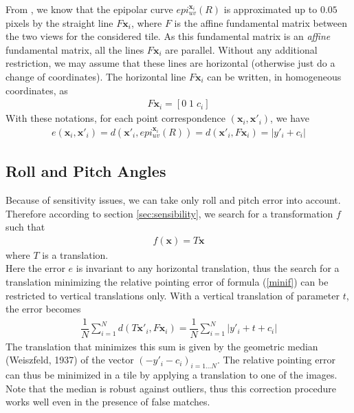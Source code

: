 \documentclass[paper=a4, fontsize=11pt]{article}
\begin{document}
From  \cite{de2014automatic}, we know that the epipolar curve $epi^{\textbf{x}_i}_{u v}(R)$ is approximated up to $0.05$ pixels by the straight line $F\textbf{x}_i$, where $F$ is
the affine fundamental matrix between the two views for the considered tile. As this fundamental matrix is an \textit{affine} fundamental matrix, all the lines $F\textbf{x}_i$ are parallel. Without any additional restriction, we may assume that these lines are horizontal (otherwise just do a change of coordinates). The horizontal line $F\textbf{x}_i$ can be written, in homogeneous coordinates, as
\begin{align*}
F\textbf{x}_i = \left[ 0 \; 1 \; c_i \right]
\end{align*}
With these notations, for each point correspondence $(\textbf{x}_i , \textbf{x}'_i)$, we have
\begin{align*}
e(\textbf{x}_i, \textbf{x}'_i) = d(\textbf{x}'_i, epi^{\textbf{x}_i}_{u v}(R)) = d(\textbf{x}'_i, F\textbf{x}_i) = | y'_i + c_i|
\end{align*}

\subsection{Roll and Pitch Angles}
Because of sensitivity issues, we can take only roll and pitch error into account. Therefore according to section \ref{sec:sensibility}, we search for a transformation $f$ such that
\begin{align*}
f(\textbf{x}) = T\textbf{x}
\end{align*}
where $T$ is a translation.\\
Here the error $e$ is invariant to any horizontal translation, thus the search for a translation minimizing the relative pointing error of formula (\ref{minif}) can be restricted to vertical translations only. With a vertical translation of parameter $t$, the error becomes
\begin{align*}
\dfrac{1}{N} \sum\limits_{i=1}^{N} d(T\textbf{x}'_i, F\textbf{x}_i) = \dfrac{1}{N} \sum\limits_{i=1}^{N} | y'_i + t+ c_i|
\end{align*}
The translation that minimizes this sum is given by the geometric median (Weiszfeld, 1937) of the vector $(-y'_i - c_i )_{i=1...N}$.  The relative pointing error can thus be minimized in a tile by applying a translation to one of the images. Note that the median is robust against outliers, thus this correction procedure works well even in the presence of false matches.
\end{document}

